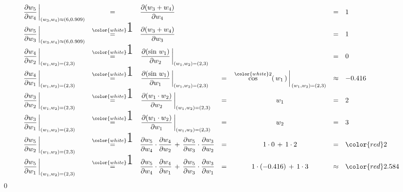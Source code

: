 \begin{equation*}
\begin{array}{lclcccl}
\left.\dfrac{\partial w_{5}}{\partial w_{4}}\,\right\vert_{(w_{3},w_{4}) \approx (6,0.909)}
& = &
	\dfrac{\partial (w_{3}+w_{4})}{\partial w_{4}}
	&&
	&=& 1
\\
\left.\dfrac{\partial w_{5}}{\partial w_{3}}\,\right\vert_{(w_{3},w_{4}) \approx (6,0.909)}
& \overset{{\color{white}\textnormal{\huge1}}}{=} &
	\dfrac{\partial (w_{3}+w_{4})}{\partial w_{3}}
	&&
	&=& 1
\\
\left.\dfrac{\partial w_{4}}{\partial w_{2}}\,\right\vert_{(w_{1},w_{2}) = (2,3)}
& \overset{{\color{white}\textnormal{\huge1}}}{=} &
	\left.\dfrac{\partial(\sin\,w_{1})}{\partial w_{2}}\,\right\vert_{(w_{1},w_{2}) = (2,3)}
	&&
	& = & 0
\\
\left.\dfrac{\partial w_{4}}{\partial w_{1}}\,\right\vert_{(w_{1},w_{2}) = (2,3)}
& \overset{{\color{white}\textnormal{\huge1}}}{=} &
	\left.\dfrac{\partial(\sin\,w_{1})}{\partial w_{1}}\,\right\vert_{(w_{1},w_{2}) = (2,3)}
	& = &
	\left.\overset{{\color{white}2}}{\cos}(\,w_{1}\,)\,\right\vert_{\,(w_{1},w_{2}) = (2,3)}
	& \approx & -0.416
\\
\left.\dfrac{\partial w_{3}}{\partial w_{2}}\,\right\vert_{(w_{1},w_{2}) = (2,3)}
& \overset{{\color{white}\textnormal{\huge1}}}{=} &
	\left.\dfrac{\partial(w_{1} \cdot w_{2})}{\partial w_{2}}\,\right\vert_{(w_{1},w_{2}) = (2,3)}
	& = &
		w_{1}
	& = &
		2
\\
\left.\dfrac{\partial w_{3}}{\partial w_{1}}\,\right\vert_{(w_{1},w_{2}) = (2,3)}
& \overset{{\color{white}\textnormal{\huge1}}}{=} &
	\left.\dfrac{\partial(w_{1} \cdot w_{2})}{\partial w_{1}}\,\right\vert_{(w_{1},w_{2}) = (2,3)}
	& = &
		w_{2}
	& = &
		3
\\
\left.\dfrac{\partial w_{5}}{\partial w_{2}}\,\right\vert_{(w_{1},w_{2}) = (2,3)}
& \overset{{\color{white}\textnormal{\huge1}}}{=} &
	\dfrac{\partial w_{5}}{\partial w_{4}} \cdot \dfrac{\partial w_{4}}{\partial w_{2}}
		\,+\,
		\dfrac{\partial w_{5}}{\partial w_{3}} \cdot \dfrac{\partial w_{3}}{\partial w_{2}}
	& = &
		1 \cdot 0 \,+\, 1 \cdot 2
	&=& {\color{red}2}
\\
\left.\dfrac{\partial w_{5}}{\partial w_{1}}\,\right\vert_{(w_{1},w_{2}) = (2,3)}
& \overset{{\color{white}\textnormal{\huge1}}}{=} &
	\dfrac{\partial w_{5}}{\partial w_{4}} \cdot \dfrac{\partial w_{4}}{\partial w_{1}}
		\,+\,
		\dfrac{\partial w_{5}}{\partial w_{3}} \cdot \dfrac{\partial w_{3}}{\partial w_{1}}
	& = &
		1 \cdot (-0.416) \,+\, 1 \cdot 3
	& \approx &
		{\color{red}2.584}
\end{array}
\end{equation*}
\qed

